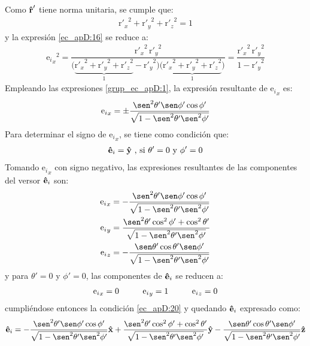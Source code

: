 Como $\bm{\mathbf{\hat{r}}}'$ tiene norma unitaria, se cumple que:
\begin{align}
{{\text{r}'}_x}^2 + {{\text{r}'}_y}^2 + {{\text{r}'}_z}^2 = 1
\label{ec_apD:17}
\end{align}
y la expresión \eqref{ec_apD:16} se reduce a:
\begin{align}
{{\text{e}_i}_x}^2 = \dfrac{{{\text{r}'}_{\!x}}^2\,{{\text{r}'}_{\!y}}^2}{\big(\underbrace{{{\text{r}'}_{\!x}}^2 + {{\text{r}'}_{\!y}}^2 + {{\text{r}'}_{\!z}}^2}_{1} - {{\text{r}'}_{\!y}}^2\big)\big(  \underbrace{{{\text{r}'}_{\!x}}^2 + {{\text{r}'}_{\!y}}^2 + {{\text{r}'}_{\!z}}^2}_{1}\big)} = \dfrac{{{\text{r}'}_{\!x}}^2\,{{\text{r}'}_{\!y}}^2}{1 - {{\text{r}'}_{\!y}}^2}
\label{ec_apD:18}
\end{align}
Empleando las expresiones \eqref{grup_ec_apD:1}, la expresión resultante de ${\text{e}_i}_x$ es:
\begin{align}
{\text{e}_i}_x = \pm\dfrac{\sen^2\theta '\sen\phi '\cos\phi '}{\sqrt{1 - \sen^2\theta '\sen^2\phi '}}
\label{ec_apD:19}
\end{align}
Para determinar el signo de ${\text{e}_i}_x$, se tiene como condición que:
\begin{align}
\bm{\mathbf{\hat{e}}}_i = \bm{\mathbf{\hat{y}}}\text{ , si }\theta ' = 0\text{ y }\phi ' = 0
\label{ec_apD:20}
\end{align}
Tomando ${\text{e}_i}_x$ con signo negativo, las expresiones resultantes de las componentes del versor $\bm{\mathbf{\hat{e}}}_i$ son:
\begin{subequations}
\label{grup_ec_apD:2}
\begin{align}
{\text{e}_i}_x &= -\dfrac{\sen^2\theta '\sen\phi '\cos\phi '}{\sqrt{1 - \sen^2\theta '\sen^2\phi '}}
\label{ec_apD:21}\\
{\text{e}_i}_y &= \dfrac{\sen^2\theta '\cos^2\phi ' + \cos^2\theta '}{\sqrt{1 - \sen^2\theta '\sen^2\phi '}}
\label{ec_apD:22}\\
{\text{e}_i}_z &= -\dfrac{\sen\theta '\cos\theta '\sen\phi '}{\sqrt{1 - \sen^2\theta '\sen^2\phi '}}
\label{ec_apD:23}
\end{align}
\end{subequations}
y para $\theta ' = 0$ y $\phi ' = 0$, las componentes de $\bm{\mathbf{\hat{e}}}_i$ se reducen a:
\begin{align*}
{\text{e}_i}_x = 0\hspace{10mm}{\text{e}_i}_y = 1\hspace{10mm}{\text{e}_i}_z = 0
\end{align*}
cumpliéndose entonces la condición \eqref{ec_apD:20} y quedando $\bm{\mathbf{\hat{e}}}_i$ expresado como:
\begin{align}
\versor{e}_i= -\dfrac{\sen^2\theta '\sen\phi '\cos\phi '}{\sqrt{1 - \sen^2\theta '\sen^2\phi '}}\versor{x} + \dfrac{\sen^2\theta '\cos^2\phi ' + \cos^2\theta'}{\sqrt{1 - \sen^2\theta '\sen^2\phi '}}\versor{y} - \dfrac{\sen\theta '\cos\theta '\sen\phi '}{\sqrt{1 - \sen^2\theta '\sen^2\phi '}}\versor{z}
\label{ec_apD:24}
\end{align}

